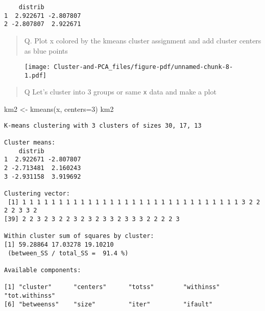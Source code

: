\documentclass[
  letterpaper,
  DIV=11,
  numbers=noendperiod]{scrartcl}
\newenvironment{Shaded}{\begin{snugshade}}{\end{snugshade}}
\newcommand{\AttributeTok}[1]{\textcolor[rgb]{0.40,0.45,0.13}{#1}}
\newcommand{\DecValTok}[1]{\textcolor[rgb]{0.68,0.00,0.00}{#1}}
\newcommand{\FunctionTok}[1]{\textcolor[rgb]{0.28,0.35,0.67}{#1}}
\newcommand{\NormalTok}[1]{\textcolor[rgb]{0.00,0.23,0.31}{#1}}
\newcommand{\OtherTok}[1]{\textcolor[rgb]{0.00,0.23,0.31}{#1}}
\newcommand{\SpecialCharTok}[1]{\textcolor[rgb]{0.37,0.37,0.37}{#1}}
\newcommand{\StringTok}[1]{\textcolor[rgb]{0.13,0.47,0.30}{#1}}
\begin{document}
\begin{verbatim}
    distrib          
1  2.922671 -2.807807
2 -2.807807  2.922671
\end{verbatim}

\begin{quote}
Q. Plot x colored by the kmeans cluster assignment and add cluster
centers as blue points
\end{quote}

\begin{Shaded}
\end{Shaded}

\begin{figure}[H]

{\centering \texttt{[image: Cluster-and-PCA\_files/figure-pdf/unnamed-chunk-8-1.pdf]}

}

\end{figure}

\begin{quote}
Q Let's cluster into 3 groups or same \texttt{x} data and make a plot
\end{quote}

\begin{Shaded}
\begin{Highlighting}[]
\NormalTok{km2 }\OtherTok{\textless{}{-}} \FunctionTok{kmeans}\NormalTok{(x, }\AttributeTok{centers=}\DecValTok{3}\NormalTok{)}
\NormalTok{km2}
\end{Highlighting}
\end{Shaded}

\begin{verbatim}
K-means clustering with 3 clusters of sizes 30, 17, 13

Cluster means:
    distrib          
1  2.922671 -2.807807
2 -2.713481  2.160243
3 -2.931158  3.919692

Clustering vector:
 [1] 1 1 1 1 1 1 1 1 1 1 1 1 1 1 1 1 1 1 1 1 1 1 1 1 1 1 1 1 1 1 3 2 2 2 2 3 3 2
[39] 2 2 3 2 3 2 2 3 2 3 2 3 3 2 3 3 3 2 2 2 2 3

Within cluster sum of squares by cluster:
[1] 59.28864 17.03278 19.10210
 (between_SS / total_SS =  91.4 %)

Available components:

[1] "cluster"      "centers"      "totss"        "withinss"     "tot.withinss"
[6] "betweenss"    "size"         "iter"         "ifault"      
\end{verbatim}
\end{document}
